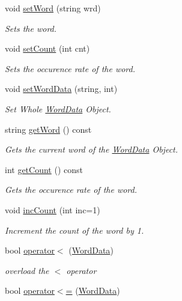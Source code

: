 \begin{DoxyCompactItemize}
\item 
void \hyperlink{classWordData_ac0b321b6cc7e3d7a352e63afd6d54a36}{set\-Word} (string wrd)
\begin{DoxyCompactList}\small\item\em Sets the word. \end{DoxyCompactList}\item 
void \hyperlink{classWordData_a861d4ccae7e79af11bfb6d39ec5ee868}{set\-Count} (int cnt)
\begin{DoxyCompactList}\small\item\em Sets the occurence rate of the word. \end{DoxyCompactList}\item 
void \hyperlink{classWordData_a9e5e59a1550b3877d464ec7e1599177f}{set\-Word\-Data} (string, int)
\begin{DoxyCompactList}\small\item\em Set Whole \hyperlink{classWordData}{Word\-Data} Object. \end{DoxyCompactList}\item 
string \hyperlink{classWordData_a0002c491de4f4bd013a1b5255024a260}{get\-Word} () const 
\begin{DoxyCompactList}\small\item\em Gets the current word of the \hyperlink{classWordData}{Word\-Data} Object. \end{DoxyCompactList}\item 
int \hyperlink{classWordData_ac60a4211f9a35484ef4aaf3ddce015a0}{get\-Count} () const 
\begin{DoxyCompactList}\small\item\em Gets the occurence rate of the word. \end{DoxyCompactList}\item 
void \hyperlink{classWordData_a68428bdb3ed9b1aafa8e3aa144decec6}{inc\-Count} (int inc=1)
\begin{DoxyCompactList}\small\item\em Increment the count of the word by 1. \end{DoxyCompactList}\item 
bool \hyperlink{classWordData_a8feae3c1fd0e169b85e8a2ec613c5847}{operator$<$} (\hyperlink{classWordData}{Word\-Data})
\begin{DoxyCompactList}\small\item\em overload the $<$ operator \end{DoxyCompactList}\item 
bool \hyperlink{classWordData_a1ba05f19de8fa4a88cfad83858be4215}{operator$<$=} (\hyperlink{classWordData}{Word\-Data})

\end{DoxyCompactItemize}
